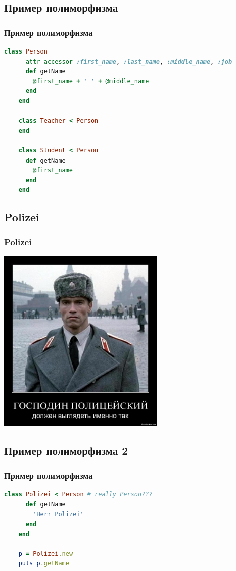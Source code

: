 \documentclass[compress,red]{beamer}
\begin{document}
\subsection{Пример полиморфизма}
\begin{frame}[fragile]
  \frametitle{Пример полиморфизма}
  \scriptsize{
  \begin{lstlisting}[language=ruby,basicstyle=\footnotesize,label=ruby6,caption=Полиморфизм]
    class Person
      attr_accessor :first_name, :last_name, :middle_name, :job
      def getName
        @first_name + ' ' + @middle_name
      end
    end
    
    class Teacher < Person
    end
    
    class Student < Person
      def getName
        @first_name
      end
    end
  \end{lstlisting}
  }
  
\end{frame}

\subsection{Polizei}
\begin{frame}[fragile]
  \frametitle{Polizei}
  \centerline{\includegraphics[width=0.6\textwidth]{images/herr_polizei.jpg}}
\end{frame}

\subsection{Пример полиморфизма 2}
\begin{frame}[fragile]
  \frametitle{Пример полиморфизма}
  \scriptsize{
  \begin{lstlisting}[language=ruby,basicstyle=\footnotesize,label=ruby7,caption=Полиморфизм]
    class Polizei < Person # really Person???
      def getName
        'Herr Polizei'
      end
    end
    
    p = Polizei.new
    puts p.getName
    
  \end{lstlisting}
  }
  
\end{frame}
\end{document}
